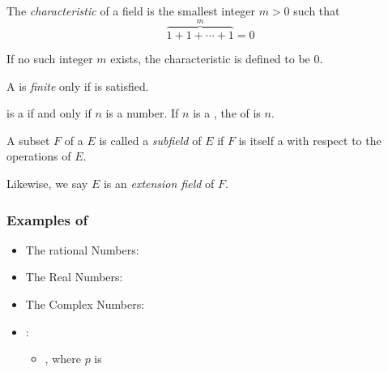 \begin{definition}[Characteristic]\label{def:Field_Characteristic}
  The \emph{characteristic} of a field is the smallest integer $m > 0$ such that
  \begin{equation}\label{eq:Field_Characteristic}
    \overbrace{1 + 1 + \cdots + 1}^{m} = 0
  \end{equation}

  If no such integer $m$ exists, the characteristic is defined to be 0.
\end{definition}

\begin{definition}\label{def:Finite_Field}
  A  is \emph{finite} only if  is satisfied.
\end{definition}

\begin{theorem}\label{thm:Finite_Field}
  \TextIntsModN{} is a  if and only if $n$ is a  number.
  If $n$ is a , the  of \TextIntsModN{} is $n$.
\end{theorem}

\begin{definition}[Subfield]\label{def:Subfield}
  A subset $F$ of a  $E$ is called a \emph{subfield} of $E$ if $F$ is itself a  with respect to the operations of $E$.
  
  \begin{remark}\label{rmk:Extension_Field}
    Likewise, we say $E$ is an \emph{extension field} of $F$.
  \end{remark}
\end{definition}

\subsubsection{Examples of }\label{subsubsec:Examples_of_Fields}
\begin{itemize}[noitemsep]
\item The rational Numbers: \TextRationalNumbers{}
\item The Real Numbers: \TextRealNumbers{}
\item The Complex Numbers: \TextComplexNumbers{}
\item {}:
  \begin{itemize}[noitemsep]
  \item {}, where $p$ is 
  \end{itemize}
\end{itemize}
